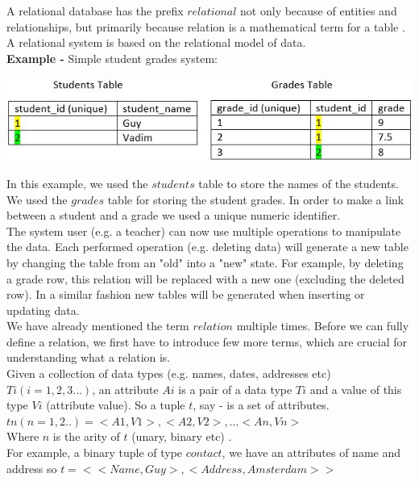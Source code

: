 \documentclass[oneside]{book}
\begin{document}
A relational database has the prefix $relational$ not only because of entities and relationships, but primarily because relation is a mathematical term 
for a table \cite[p.~26]{introtodb}. A relational system is based on the relational model of data.\\

\textbf{Example -} Simple student grades system:

\begin{center}
\includegraphics[scale=0.9]{table1}
\end{center}

In this example, we used the $students$ table to store the names of the students. We used the $grades$ table for storing the student grades. In order to make a link between a student and a grade we used a unique numeric identifier. \\

The system user (e.g. a teacher) can now use multiple operations to manipulate the data. Each performed operation (e.g. deleting data) will generate a new table by changing the table from an "old" into a "new" state. For example, by deleting a grade row, this relation will be replaced with a new one (excluding the deleted row). In a similar fashion new tables will be generated when inserting or updating data. \\

We have already mentioned the term $relation$ multiple times. Before we can fully define a relation, we first have to introduce few more terms, which are crucial for understanding what a relation is.\\

Given a collection of data types (e.g. names, dates, addresses etc) $Ti(i=1,2,3...)$, an attribute $Ai$ is a pair of a data type $Ti$ and a value of this type $Vi$ (attribute value). So a tuple $t$, say - is a set of attributes.\\
$tn(n=1,2..)={<A1, V1>, <A2, V2>, ... <An, Vn>}$\\
Where $n$ is the arity of $t$ (unary, binary etc) \cite[p.~142]{introtodb}.\\
For example, a binary tuple of type $contact$, we have an attributes of name and address so $t = <<Name, Guy>, <Address, Amsterdam>>$
\end{document}
